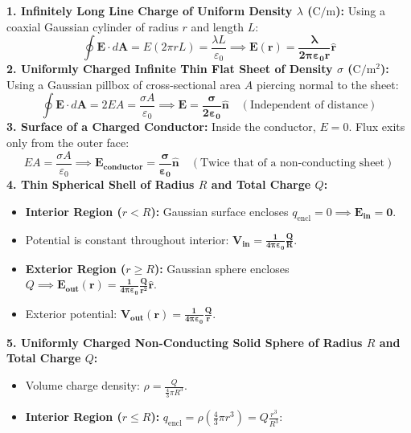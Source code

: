 \documentclass[10pt,a4paper]{article}
\begin{document}
\begin{formulabox}
\textbf{1. Infinitely Long Line Charge of Uniform Density $\lambda$ ($\mathrm{C/m}$):}
Using a coaxial Gaussian cylinder of radius $r$ and length $L$:
\begin{equation}
  \oint \mathbf{E}\cdot d\mathbf{A} = E(2\pi r L) = \frac{\lambda L}{\varepsilon_0} \implies \mathbf{E(r) = \frac{\lambda}{2\pi\varepsilon_0 r}\hat{\mathbf{r}}}
\end{equation}
\textbf{2. Uniformly Charged Infinite Thin Flat Sheet of Density $\sigma$ ($\mathrm{C/m^2}$):}
Using a Gaussian pillbox of cross-sectional area $A$ piercing normal to the sheet:
\begin{equation}
  \oint \mathbf{E}\cdot d\mathbf{A} = 2 E A = \frac{\sigma A}{\varepsilon_0} \implies \mathbf{E = \frac{\sigma}{2\varepsilon_0}\hat{\mathbf{n}}} \quad (\text{Independent of distance})
\end{equation}
\textbf{3. Surface of a Charged Conductor:}
Inside the conductor, $E=0$. Flux exits only from the outer face:
\begin{equation}
  E A = \frac{\sigma A}{\varepsilon_0} \implies \mathbf{E_{\text{conductor}} = \frac{\sigma}{\varepsilon_0}\hat{\mathbf{n}}} \quad (\text{Twice that of a non-conducting sheet})
\end{equation}
\textbf{4. Thin Spherical Shell of Radius $R$ and Total Charge $Q$:}
\begin{itemize}
  \item \textbf{Interior Region ($r < R$):} Gaussian surface encloses $q_{\text{encl}} = 0 \implies \mathbf{E_{\text{in}} = 0}$.
  \item Potential is constant throughout interior: $\mathbf{V_{\text{in}} = \frac{1}{4\pi\varepsilon_0}\frac{Q}{R}}$.
  \item \textbf{Exterior Region ($r \ge R$):} Gaussian sphere encloses $Q \implies \mathbf{E_{\text{out}}(r) = \frac{1}{4\pi\varepsilon_0}\frac{Q}{r^2}\hat{\mathbf{r}}}$.
  \item Exterior potential: $\mathbf{V_{\text{out}}(r) = \frac{1}{4\pi\varepsilon_0}\frac{Q}{r}}$.
\end{itemize}
\textbf{5. Uniformly Charged Non-Conducting Solid Sphere of Radius $R$ and Total Charge $Q$:}
\begin{itemize}
  \item Volume charge density: $\rho = \frac{Q}{\frac{4}{3}\pi R^3}$.
  \item \textbf{Interior Region ($r \le R$):} $q_{\text{encl}} = \rho \left(\frac{4}{3}\pi r^3\right) = Q \frac{r^3}{R^3}$:

\end{itemize}
\end{formulabox}
\end{document}
